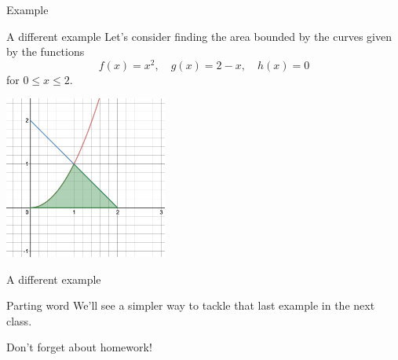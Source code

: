 \documentclass[presentation]{beamer}
\begin{document}
\begin{frame}[label={sec:org23947ec}]{Example}
\end{frame}

\begin{frame}[label={sec:orgcc86c5c}]{A different example}
Let's consider finding the area bounded by the curves given by the
functions
\[
f(x) = x^2, \quad g(x) = 2 - x, \quad h(x) = 0 \]
for \(0 \le x \le 2\).
\begin{center}
\includegraphics[width=0.4\textwidth]{../img/day004-ex3.png}
\end{center}
\end{frame}

\begin{frame}[label={sec:org0ebfc53}]{A different example}
\end{frame}

\begin{frame}[label={sec:org93662e0}]{Parting word}
We'll see a simpler way to tackle that last example in the next class.

Don't forget about homework!
\end{frame}
\end{document}
